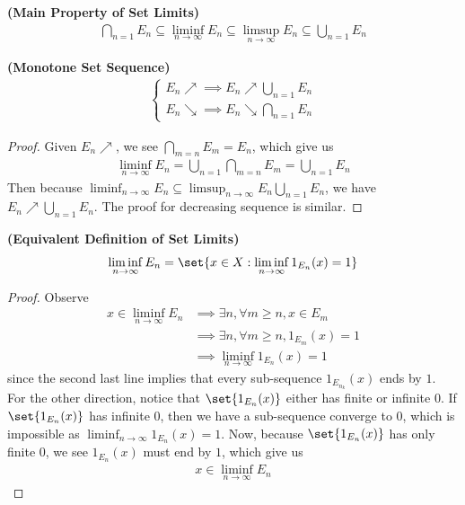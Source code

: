\documentclass{report}
\begin{document}
\begin{corollary}
\label{0.7.7}
\textbf{(Main Property of Set Limits)} 
\begin{align*}
\bigcap_{n=1} E_n \subseteq \liminf_{n\to\infty} E_n \subseteq \limsup_{n\to\infty} E_n \subseteq \bigcup_{n=1} E_n 
\end{align*}
\end{corollary}
\begin{corollary}
\label{0.7.8}
\textbf{(Monotone Set Sequence)}
\begin{align*}
\begin{cases}
  E_n \nearrow \implies E_n \nearrow \bigcup_{n=1} E_n\\
  E_n \searrow \implies E_n \searrow \bigcap_{n=1} E_n
\end{cases}
\end{align*}
\end{corollary}
\begin{proof}
Given $E_n\nearrow$, we see  $\bigcap_{m=n} E_m=E_n$, which give us 
\begin{align*}
\liminf_{n\to\infty} E_n=\bigcup_{n=1} \bigcap_{m=n} E_m=\bigcup_{n=1}E_n
\end{align*}
Then because $\liminf_{n\to\infty} E_n\subseteq\limsup_{n\to\infty} E_n\bigcup_{n=1}E_n$, we have $E_n\nearrow \bigcup_{n=1}E_n$. The proof for decreasing sequence is similar.
\end{proof}
\begin{theorem}
\label{0.7.9}
\textbf{(Equivalent Definition of Set Limits)}
\begin{align*}
\liminf_{n\to\infty} E_n= \set{x \in X: \liminf_{n\to\infty} 1_{E_n}(x)=1}
\end{align*}
\end{theorem}
\begin{proof}
Observe 
\begin{align*}
  x \in \liminf_{n\to\infty} E_n &\implies \exists n , \forall m\geq n, x \in E_m \\
&\implies \exists n ,\forall m\geq n, 1_{E_m}(x)=1 \\
&\implies \liminf_{n\to\infty} 1_E_n(x)=1
\end{align*}
since the second last line implies that every sub-sequence $1_{E_{n_k}}(x)$ ends by $1$.\\

For the other direction, notice that $\set{1_{E_n}(x)}$ either has finite or infinite $0$. If $\set{1_{E_n}(x)}$ has infinite $0$, then we have a sub-sequence converge to $0$, which is impossible as  $\liminf_{n\to\infty} 1_{E_n}(x)=1$. Now, because $\set{1_{E_n}(x)}$ has only finite $0$, we see $1_{E_n}(x)$ must end by $1$, which give us 
 \begin{align*}
x \in \liminf_{n\to\infty}  E_n
\end{align*}
\end{proof}
\end{document}
